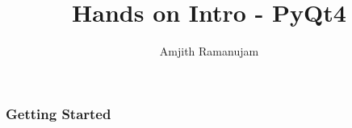 \documentclass[10pt]{beamer}
\title{Hands on Intro - PyQt4}
\author{Amjith Ramanujam}
\institute{twitter: amjith\_\\
blog: amjith.blogspot.com}
\date{}
\begin{document}
\begin{frame}
    \titlepage
\end{frame}

\begin{frame}
    \frametitle{Getting Started}
    \begin{block}
        \begin{itemize}
        \end{itemize}
    \end{block}
\end{frame}
\end{document}
